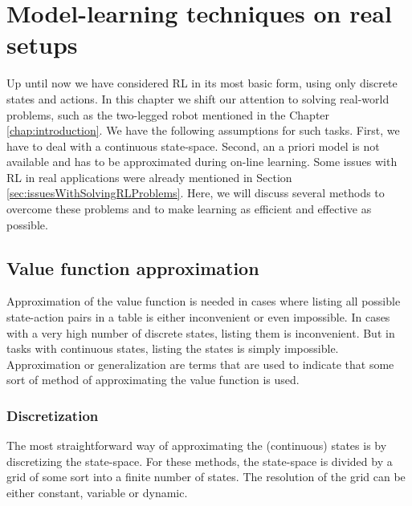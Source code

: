 \documentclass[a4paper,11pt]{mscLiterature}
\begin{document}
\chapter{Model-learning techniques on real setups} \label{chap:modelLearningTechniquesOnRealSystems}
Up until now we have considered RL in its most basic form, using only discrete states and actions. In this chapter we shift our attention to solving real-world problems, such as the two-legged robot mentioned in the Chapter \ref{chap:introduction}. We have the following assumptions for such tasks. First, we have to deal with a continuous state-space. Second, an a priori model is not available and has to be approximated during on-line learning. Some issues with RL in real applications were already mentioned in Section \ref{sec:issuesWithSolvingRLProblems}. Here, we will discuss several methods to overcome these problems and to make learning as efficient and effective as possible.


	
	
\section{Value function approximation}\label{sec:ApproximatingTheValueFunction}
	Approximation of the value function is needed in cases where listing all possible state-action pairs in a table is either inconvenient or even impossible. In cases with a very high number of discrete states, listing them is inconvenient. But in tasks with continuous states, listing the states is simply impossible. Approximation or generalization are terms that are used to indicate that some sort of method of approximating the value function is used.
	
	\subsection{Discretization}\label{sec:discretization}
	The most straightforward way of approximating the (continuous) states is by discretizing the state-space. For these methods, the state-space is divided by a grid of some sort into a finite number of states. The resolution of the grid can be either constant, variable or dynamic. 
\end{document}
